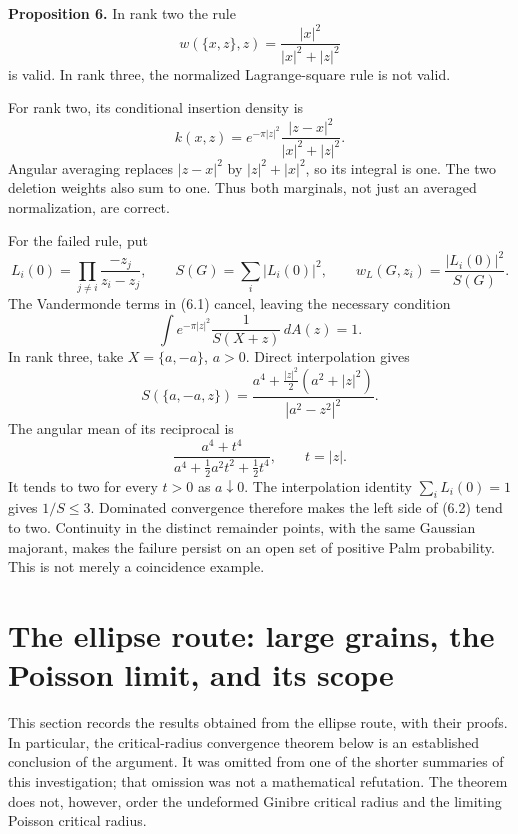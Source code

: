 \documentclass[11pt,a4paper]{article}
\theoremstyle{definition}
\theoremstyle{remark}
\numberwithin{equation}{section}
\begin{document}
\textbf{Proposition 6.} In rank two the rule \[
w(\{x,z\},z)=\frac{|x|^2}{|x|^2+|z|^2}
\] is valid. In rank three, the normalized Lagrange-square rule is not valid.

For rank two, its conditional insertion density is \[
k(x,z)=e^{-\pi|z|^2}
\frac{|z-x|^2}{|x|^2+|z|^2}.
\] Angular averaging replaces \(|z-x|^2\) by \(|z|^2+|x|^2\), so its integral is one. The two deletion weights also sum to one. Thus both marginals, not just an averaged normalization, are correct.

For the failed rule, put \[
L_i(0)=\prod_{j\ne i}\frac{-z_j}{z_i-z_j},
\qquad S(G)=\sum_i|L_i(0)|^2,\qquad
w_L(G,z_i)=\frac{|L_i(0)|^2}{S(G)}.
\] The Vandermonde terms in (6.1) cancel, leaving the necessary condition \[
\int e^{-\pi|z|^2}\frac1{S(X+z)}\,dA(z)=1.
\tag{6.2}
\] In rank three, take \(X=\{a,-a\}\), \(a>0\). Direct interpolation gives \[
S(\{a,-a,z\})
=\frac{a^4+\frac{|z|^2}{2}(a^2+|z|^2)}
 {|a^2-z^2|^2}.
\] The angular mean of its reciprocal is \[
\frac{a^4+t^4}{a^4+\frac12a^2t^2+\frac12t^4},
\qquad t=|z|.
\] It tends to two for every \(t>0\) as \(a\downarrow0\). The interpolation identity \(\sum_iL_i(0)=1\) gives \(1/S\le3\). Dominated convergence therefore makes the left side of (6.2) tend to two. Continuity in the distinct remainder points, with the same Gaussian majorant, makes the failure persist on an open set of positive Palm probability. This is not merely a coincidence example.


\setcounter{theorem}{6}

\section{The ellipse route: large grains, the Poisson limit, and its scope}
\label{ell:section}

This section records the results obtained from the ellipse route, with
their proofs.  In particular, the critical-radius convergence theorem
below is an established conclusion of the argument.  It was omitted
from one of the shorter summaries of this investigation; that omission
was not a mathematical refutation.  The theorem does not, however,
order the undeformed Ginibre critical radius and the limiting Poisson
critical radius.
\end{document}

